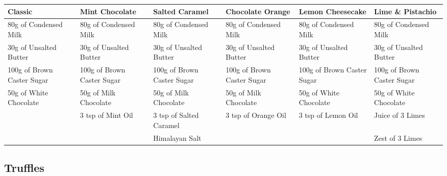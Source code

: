\documentclass[11pt, english]{article}
\begin{document}
	\begin{table}[h]
	        \scriptsize
	\begin{center}
	\begin{tabular}{p{2.5cm}p{2.5cm}p{2.5cm}p{2.5cm}p{2.5cm}p{2.5cm}}
	        \hline
	        \textbf{Classic} & \textbf{Mint Chocolate} & \textbf{Salted Caramel} & \textbf{Chocolate Orange} & \textbf{Lemon Cheesecake} & \textbf{Lime \& Pistachio}\\
	        \hline
	        80g of Condensed Milk & 80g of Condensed Milk & 80g of Condensed Milk & 80g of Condensed Milk & 80g of Condensed Milk & 80g of Condensed Milk\\
	        30g of Unsalted Butter & 30g of Unsalted Butter & 30g of Unsalted Butter & 30g of Unsalted Butter & 30g of Unsalted Butter & 30g of Unsalted Butter\\
	        100g of Brown Caster Sugar & 100g of Brown Caster Sugar & 100g of Brown Caster Sugar & 100g of Brown Caster Sugar & 100g of Brown Caster Sugar & 100g of Brown Caster Sugar\\
	        50g of White Chocolate & 50g of Milk Chocolate & 50g of Milk Chocolate & 50g of Milk Chocolate & 50g of White Chocolate & 50g of White Chocolate\\
	        & 3 tsp of Mint Oil & 3 tsp of Salted Caramel & 3 tsp of Orange Oil & 3 tsp of Lemon Oil & Juice of 3 Limes\\
	        & & Himalayan Salt & & & Zest of 3 Limes\\
        	\hline
	\end{tabular}
	\end{center}
	\end{table}

\newpage

	\subsection{Truffles}
\end{document}
